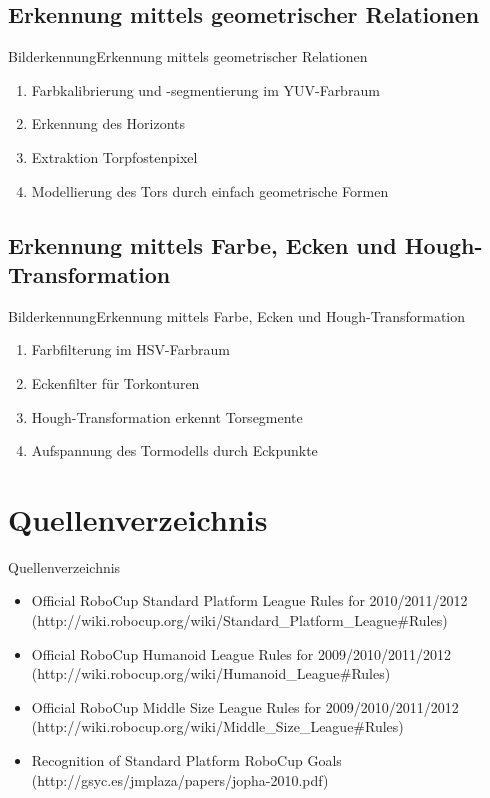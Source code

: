 \documentclass{beamer}
\begin{document}
\subsection{Erkennung mittels geometrischer Relationen}
\begin{frame}{Bilderkennung}{Erkennung mittels geometrischer Relationen}
\begin{enumerate}
    \item Farbkalibrierung und -segmentierung im YUV-Farbraum
    \item Erkennung des Horizonts
    \item Extraktion Torpfostenpixel
    \item Modellierung des Tors durch einfach geometrische Formen
\end{enumerate}
\end{frame}

\subsection{Erkennung mittels Farbe, Ecken und Hough-Transformation}
\begin{frame}{Bilderkennung}{Erkennung mittels Farbe, Ecken und Hough-Transformation}
\begin{enumerate}
    \item Farbfilterung im HSV-Farbraum
    \item Eckenfilter für Torkonturen
    \item Hough-Transformation erkennt Torsegmente
    \item Aufspannung des Tormodells durch Eckpunkte
\end{enumerate}
\end{frame}

\section*{Quellenverzeichnis}
\begin{frame}{Quellenverzeichnis}
\begin{tiny}
\begin{itemize}
    \item Official RoboCup Standard Platform League Rules for 2010/2011/2012  (http://wiki.robocup.org/wiki/Standard\_Platform\_League\#Rules)
    \item Official RoboCup Humanoid League Rules for 2009/2010/2011/2012 (http://wiki.robocup.org/wiki/Humanoid\_League\#Rules)
    \item Official RoboCup Middle Size League Rules for 2009/2010/2011/2012 (http://wiki.robocup.org/wiki/Middle\_Size\_League\#Rules)
    \item Recognition of Standard Platform RoboCup Goals (http://gsyc.es/jmplaza/papers/jopha-2010.pdf)
\end{itemize}
\end{tiny}
\end{frame}
\end{document}
